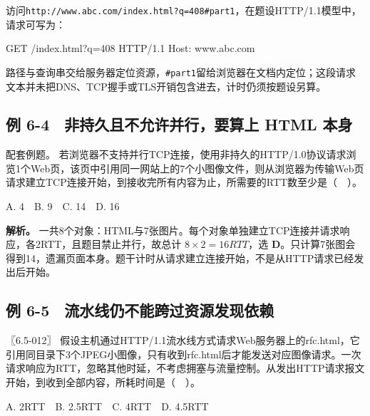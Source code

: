 \begin{example}[请求目标不包含片段标识]

访问\texttt{http:\allowbreak{}/\allowbreak{}/\allowbreak{}www.\allowbreak{}abc.\allowbreak{}com/\allowbreak{}index.\allowbreak{}html?q=\allowbreak{}408\#part1}，在题设HTTP/1.1模型中，请求可写为：

\par\medskip\noindent\begin{minipage}{\linewidth}
\begin{codeblock}[language={}]
GET /index.html?q=408 HTTP/1.1
Host: www.abc.com
\end{codeblock}
\end{minipage}\par\medskip

\end{example}

路径与查询串交给服务器定位资源，\texttt{\#part1}留给浏览器在文档内定位；这段请求文本并未把DNS、TCP握手或TLS开销包含进去，计时仍须按题设另算。

\subsection{例 6-4　非持久且不允许并行，要算上 HTML 本身}\label{CN06-ex4}

\begin{example}[配套例题]

配套例题。 若浏览器不支持并行TCP连接，使用非持久的HTTP/1.0协议请求浏览1个Web页，该页中引用同一网站上的7个小图像文件，则从浏览器为传输Web页请求建立TCP连接开始，到接收完所有内容为止，所需要的RTT数至少是（　）。

A. 4　B. 9　C. 14　D. 16

\end{example}

\textbf{解析。} 一共8个对象：HTML与7张图片。每个对象单独建立TCP连接并请求响应，各2RTT，且题目禁止并行，故总计 \(8\times2=16RTT\)，选 \textbf{D}。只计算7张图会得到14，遗漏页面本身。题干计时从请求建立连接开始，不是从HTTP请求已经发出后开始。

\subsection{例 6-5　流水线仍不能跨过资源发现依赖}\label{CN06-ex5}

\begin{example}[配套例题]

〖6.5-012〗 假设主机通过HTTP/1.1流水线方式请求Web服务器上的rfc.html，它引用同目录下3个JPEG小图像，只有收到rfc.html后才能发送对应图像请求。一次请求响应为RTT，忽略其他时延，不考虑拥塞与流量控制。从发出HTTP请求报文开始，到收到全部内容，所耗时间是（　）。

A. 2RTT　B. 2.5RTT　C. 4RTT　D. 4.5RTT

\end{example}

